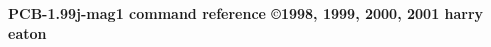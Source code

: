 %
%
%
%
%
%



%

\textwidth 27.16cm   \hsize\textwidth
\textheight 18.46cm  \vsize\textheight
\voffset -0.2in
\hoffset -0.5in

\topmargin 0cm
\headheight 0cm
\headsep 0cm
\topskip 0cm
\footskip 0cm
\footheight 1cm
\oddsidemargin 0cm
\evensidemargin 0cm
\marginparwidth 0cm

%
\def\BoxWidth{8.7cm}
\def\BoxHeight{15cm}
\def\BoxRaise{-\BoxHeight}

%
\newcommand{\Shift}{{\it [S]}}
\newcommand{\Ctrl}{{\it [C]}}
\newcommand{\Mod}{{\it [M]}}
\newcommand{\Btn}{{\it Btn}}
\newcommand{\Fun}{{\it F}}

\thispagestyle{empty}



\centerline{\Huge\bf PCB-1.99j-mag1 command reference
{\scriptsize \copyright 1998, 1999, 2000, 2001 harry eaton}}
\bigskip
\small

